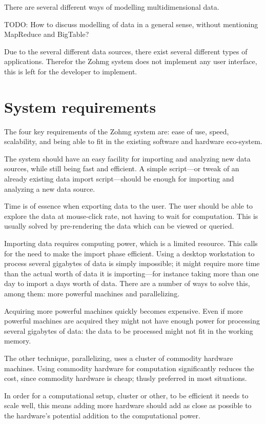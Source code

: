 There are several different ways of modelling multidimensional data.

TODO: How to discuss modelling of data in a general sense, without mentioning
MapReduce and BigTable?

Due to the several different data sources, there exist several different types
of applications. Therefor the Zohmg system does not implement any user
interface, this is left for the developer to implement.


\section{System requirements}

The four key requirements of the Zohmg system are: ease of use, speed,
scalability, and being able to fit in the existing software and hardware
eco-system.

The system should have an easy facility for importing and analyzing new data
sources, while still being fast and efficient. A simple script---or tweak of an
already existing data import script---should be enough for importing and
analyzing a new data source.

Time is of essence when exporting data to the user. The user should be able to
explore the data at mouse-click rate, not having to wait for computation. This
is usually solved by pre-rendering the data which can be viewed or queried.

Importing data requires computing power, which is a limited resource. This calls
for the need to make the import phase efficient. Using a desktop workstation to
process several gigabytes of data is simply impossible; it might require more
time than the actual worth of data it is importing---for instance taking more
than one day to import a days worth of data. There are a number of ways to solve
this, among them: more powerful machines and parallelizing.

Acquiring more powerful machines quickly becomes expensive. Even if more
powerful machines are acquired they might not have enough power for processing
several gigabytes of data: the data to be processed might not fit in the working
memory.

The other technique, parallelizing, uses a cluster of commodity hardware
machines. Using commodity hardware for computation significantly reduces the
cost, since commodity hardware is cheap; thusly preferred in most situations.

In order for a computational setup, cluster or other, to be efficient it needs
to scale well, this means adding more hardware should add as close as possible
to the hardware's potential addition to the computational power.


